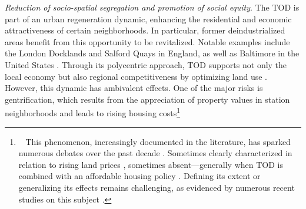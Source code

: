 \begin{refsegment}
\textsl{Reduction of socio-spatial segregation and promotion of social equity}. The \acrshort{TOD} is part of an urban regeneration dynamic, enhancing the residential and economic attractiveness of certain neighborhoods. In particular, former deindustrialized areas benefit from this opportunity to be revitalized. Notable examples include the London Docklands and Salford Quays in England, as well as Baltimore in the United States \textcolor{blue}{\autocites[42, 46, 68]{knowles_investigation_2014}[6]{knowles_evaluation_2016}}. Through its polycentric approach, \acrshort{TOD} supports not only the local economy but also regional competitiveness by optimizing land use \textcolor{blue}{\autocite[40]{litman_evaluating_2011}}. However, this dynamic has ambivalent effects. One of the major risks is gentrification, which results from the appreciation of property values in station neighborhoods and leads to rising housing costs\footnote{~
    This phenomenon, increasingly documented in the literature, has sparked numerous debates over the past decade \textcolor{blue}{\autocite[738]{padeiro_transit-oriented_2019}}. Sometimes clearly characterized in relation to rising land prices \textcolor{blue}{\autocite[14-15]{wu_impacts_2020}}, sometimes absent—generally when \acrshort{TOD} is combined with an affordable housing policy \textcolor{blue}{\autocite[16]{dawkins_transit-induced_2016}}. Defining its extent or generalizing its effects remains challenging, as evidenced by numerous recent studies on this subject \textcolor{blue}{\autocites{cook_light_2019}{padeiro_transit-oriented_2019}{ewing_is_2022}{wan_equity_2023}}.
}
\end{refsegment}
